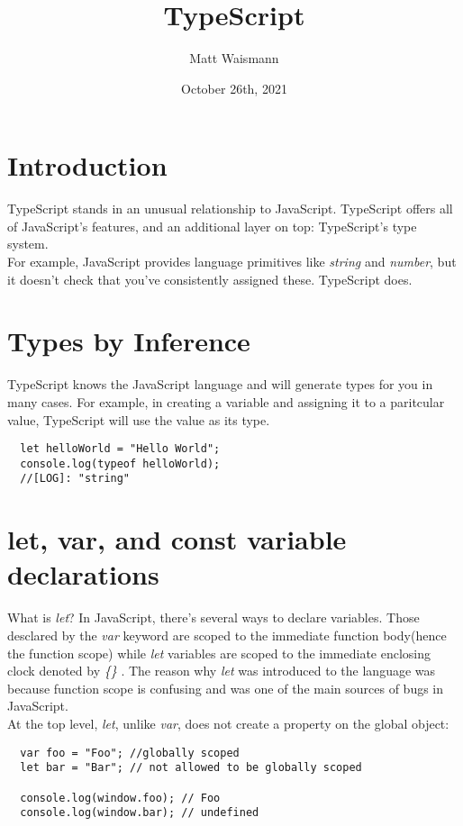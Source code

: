 \documentclass{article}%
\title{TypeScript}
\date{October 26th, 2021}
\author{Matt Waismann}
\begin{document}
\maketitle
\section{Introduction}
TypeScript stands in an unusual relationship to JavaScript. TypeScript offers all of JavaScript's
features, and an additional layer on top: TypeScript's type system. \\

For example, JavaScript provides language primitives like \textit{string} and \textit{number}, but
it doesn't check that you've consistently assigned these. TypeScript does. \\

\section{Types by Inference}
TypeScript knows the JavaScript language and will generate types for you in many cases.
For example, in creating a variable and assigning it to a paritcular value, TypeScript
will use the value as its type.
\begin{lstlisting}
  let helloWorld = "Hello World";
  console.log(typeof helloWorld); 
  //[LOG]: "string" 
\end{lstlisting}

\section{let, var, and const variable declarations}
What is \textit{let}? In JavaScript,
there's several ways to declare variables. Those desclared by the
\textit{var} keyword are scoped to the immediate function body(hence the function scope) while
\textit{let} variables are scoped to the immediate enclosing clock denoted by \textit{\{\} }.
The reason why \textit{let} was introduced to the language was because function scope is confusing
and was one of the main sources of bugs in JavaScript. \\

At the top level, \textit{let}, unlike \textit{var}, does not create a property on the global object:
\begin{lstlisting}
  var foo = "Foo"; //globally scoped
  let bar = "Bar"; // not allowed to be globally scoped

  console.log(window.foo); // Foo
  console.log(window.bar); // undefined
\end{lstlisting}
\end{document}
